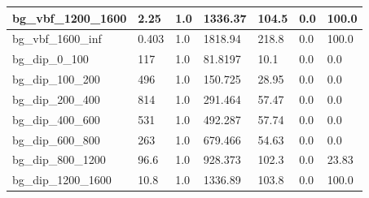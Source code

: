 \documentclass[a4paper, 10pt]{article}
\begin{document}
\begin{table}[H]
\begin{center}
\begin{tabular}{|m{23.0mm}|m{23.0mm}|m{18.0mm}|m{19.0mm}|m{19.0mm}|m{19.0mm}|m{19.0mm}|}
      \hline
      {\cellcolor{white}         bg\_vbf\_1200\_1600}& {\cellcolor{white}         2.25}& {\cellcolor{white}         1.0}& {\cellcolor{white}         1336.37}& {\cellcolor{white}         104.5}& {\cellcolor{red}         0.0}& {\cellcolor{red}         100.0}\\
      \hline
      {\cellcolor{white}         bg\_vbf\_1600\_inf}& {\cellcolor{white}         0.403}& {\cellcolor{white}         1.0}& {\cellcolor{white}         1818.94}& {\cellcolor{white}         218.8}& {\cellcolor{red}         0.0}& {\cellcolor{red}         100.0}\\
      \hline
      {\cellcolor{white}         bg\_dip\_0\_100}& {\cellcolor{white}         117}& {\cellcolor{white}         1.0}& {\cellcolor{white}         81.8197}& {\cellcolor{white}         10.1}& {\cellcolor{green}         0.0}& {\cellcolor{green}         0.0}\\
      \hline
      {\cellcolor{white}         bg\_dip\_100\_200}& {\cellcolor{white}         496}& {\cellcolor{white}         1.0}& {\cellcolor{white}         150.725}& {\cellcolor{white}         28.95}& {\cellcolor{green}         0.0}& {\cellcolor{green}         0.0}\\
      \hline
      {\cellcolor{white}         bg\_dip\_200\_400}& {\cellcolor{white}         814}& {\cellcolor{white}         1.0}& {\cellcolor{white}         291.464}& {\cellcolor{white}         57.47}& {\cellcolor{green}         0.0}& {\cellcolor{green}         0.0}\\
      \hline
      {\cellcolor{white}         bg\_dip\_400\_600}& {\cellcolor{white}         531}& {\cellcolor{white}         1.0}& {\cellcolor{white}         492.287}& {\cellcolor{white}         57.74}& {\cellcolor{green}         0.0}& {\cellcolor{green}         0.0}\\
      \hline
      {\cellcolor{white}         bg\_dip\_600\_800}& {\cellcolor{white}         263}& {\cellcolor{white}         1.0}& {\cellcolor{white}         679.466}& {\cellcolor{white}         54.63}& {\cellcolor{green}         0.0}& {\cellcolor{green}         0.0}\\
      \hline
      {\cellcolor{white}         bg\_dip\_800\_1200}& {\cellcolor{white}         96.6}& {\cellcolor{white}         1.0}& {\cellcolor{white}         928.373}& {\cellcolor{white}         102.3}& {\cellcolor{red}         0.0}& {\cellcolor{red}         23.83}\\
      \hline
      {\cellcolor{white}         bg\_dip\_1200\_1600}& {\cellcolor{white}         10.8}& {\cellcolor{white}         1.0}& {\cellcolor{white}         1336.89}& {\cellcolor{white}         103.8}& {\cellcolor{red}         0.0}& {\cellcolor{red}         100.0}\\

\end{tabular}
\end{center}
\end{table}
\end{document}
